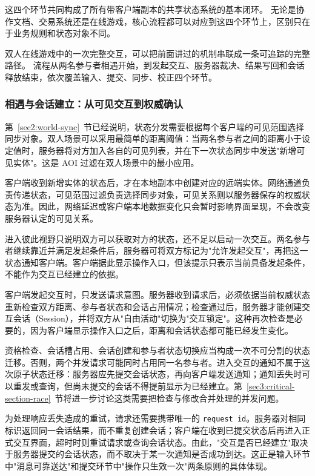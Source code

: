 这四个环节共同构成了所有带客户端副本的共享状态系统的基本闭环。
无论是协作文档、交易系统还是在线游戏，核心流程都可以对应到这四个环节上，区别只在于业务规则和状态对象不同。

双人在线游戏中的一次完整交互，可以把前面讲过的机制串联成一条可追踪的完整路径。
流程从两名参与者相遇开始，到发起交互、服务器裁决、结果写回和会话释放结束，依次覆盖输入、提交、同步、校正四个环节。

\subsubsection{相遇与会话建立：从可见交互到权威确认}\label{sec2:before-battle}

第~\ref{sec2:world-sync}~节已经说明，状态分发需要根据每个客户端的可见范围选择同步对象。双人场景可以采用最简单的距离阈值：当两名参与者之间的距离小于设定值时，服务器将对方加入各自的可见列表，并在下一次状态同步中发送"新增可见实体"。这是 AOI 过滤在双人场景中的最小应用。

客户端收到新增实体的状态后，才在本地副本中创建对应的远端实体。网络通道负责传递状态，可见范围过滤负责选择同步对象，可见关系则以服务器保存的权威状态为准。因此，网络延迟或客户端本地数据变化只会暂时影响界面呈现，不会改变服务器认定的可见关系。

进入彼此视野只说明双方可以获取对方的状态，还不足以启动一次交互。两名参与者继续靠近并满足发起条件后，服务器可将双方标记为"允许发起交互"，再把这一状态通知客户端。客户端据此显示操作入口，但该提示只表示当前具备发起条件，不能作为交互已经建立的依据。

客户端发起交互时，只发送请求意图。服务器收到请求后，必须依据当前权威状态重新检查双方距离、参与者状态和会话占用情况；检查通过后，服务器才能创建交互会话（Session），并将双方从"自由活动"切换为"交互锁定"。这种再次检查是必要的，因为客户端显示操作入口之后，距离和会话状态都可能已经发生变化。

资格检查、会话槽占用、会话创建和参与者状态切换应当构成一次不可分割的状态迁移。否则，两个并发请求可能同时占用同一名参与者。进入交互的通知不属于这次原子状态迁移：服务器应先提交会话状态，再向客户端发送通知；通知丢失时可以重发或查询，但尚未提交的会话不得提前显示为已经建立。第~\ref{sec3:critical-section-race}~节将进一步讨论这类需要把检查与修改合并处理的并发问题。

为处理响应丢失造成的重试，请求还需要携带唯一的 \texttt{request id}。服务器对相同标识返回同一会话结果，而不重复创建会话；客户端在收到已提交状态后再进入正式交互界面，超时时则重试请求或查询会话状态。由此，"交互是否已经建立"取决于服务器提交的会话状态，而不取决于某一次通知是否成功到达。这正是输入环节中"消息可靠送达"和提交环节中"操作只生效一次"两条原则的具体体现。

